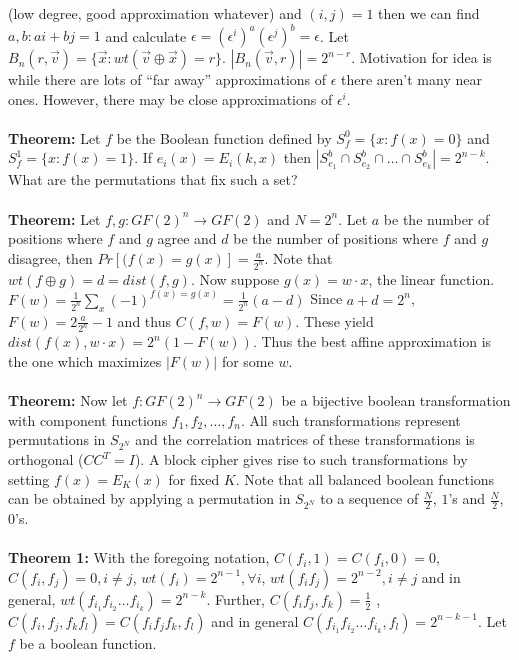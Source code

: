 (low degree, good approximation whatever)
and $(i,j)=1$ then we can find $a, b: ai+bj=1$ and calculate
$\epsilon= (\epsilon^i)^a (\epsilon^j)^b= \epsilon$.  Let $B_n(r,{\vec v})=
\{ {\vec x} :  wt({\vec v} \oplus {\vec x}) =r \}$. $|B_n({\vec v}, r)|= 2^{n-r}$.  
Motivation for idea is while
there are lots of ``far away'' approximations of $\epsilon$ there aren't many near ones.  
However,
there may be close approximations of $\epsilon^i$.
\\
\\
{\bf Theorem:}
Let $f$ be the Boolean function defined by
$S^0_f= \{x: f(x)=0 \}$ and
$S^1_f= \{x: f(x)=1 \}$.  
If $e_i(x)= E_i(k,x)$ then 
$| S^{b}_{e_1} \cap S^{b}_{e_2} \cap \ldots \cap S^{b}_{e_k} |=2^{n-k}$.  What
are the permutations that fix such a set?
\\
\\
{\bf Theorem:}
Let $f,g: GF(2)^n \rightarrow GF(2)$ and $N= 2^n$.
Let $a$ be the number of positions where $f$ and $g$ agree and
$d$ be the number of positions where $f$ and $g$ disagree, then
$Pr[(f(x)=g(x)] = {\frac a {2^n}}$.
Note that
$wt(f \oplus g)=d= dist(f,g)$.  
Now suppose $g(x)= w \cdot x$,
the linear function.  $F(w)= {\frac 1 {2^n}} \sum_x (-1)^{f(x)=g(x)}= {\frac 1 {2^n}} (a-d)$
Since $a+d=2^n$, $F(w)= 2 {\frac a {2^n}} -1$ and thus $C(f,w)= F(w)$.  These yield
$dist(f(x),w \cdot x)= 2^n(1-F(w))$.  Thus the best affine approximation is the one which
maximizes $|F(w)|$ for some $w$.
\\
\\
{\bf Theorem:}
Now let $f: GF(2)^n \rightarrow GF(2)$ be a bijective boolean transformation with component
functions $f_1 , f_2 , \ldots , f_n$.  All such transformations represent
permutations in $S_{2^N}$ and the correlation matrices of these transformations is orthogonal
($C C^T = I$).  A block cipher gives rise to such transformations by setting $f(x)= E_K(x)$ for
fixed $K$.  Note that all balanced boolean functions can be obtained by applying a
permutation in $S_{2^N}$ to a sequence of ${\frac N 2}$, $1$'s and ${\frac N 2}$, $0$'s.
\\
\\
{\bf Theorem 1:} 
With the foregoing notation,
$C(f_i,1)= C(f_i,0)=0$, $C(f_i, f_j)=0, i \ne j$,
$wt(f_i)= 2^{n-1}, \forall i$, $wt(f_i f_j) = 2^{n-2}, i \ne j$ and in general,
$wt( f_{i_1} f_{i_2} \ldots f_{i_k})= 2^{n-k}$.  Further, $C(f_i f_j, f_k)= {\frac 1 2}$ ,
$C(f_i, f_j, f_k f_l) = C(f_i f_j f_k, f_l)$ and
in general
$C( f_{i_1} f_{i_2} \ldots f_{i_k}, f_l)= 2^{n-k-1}$. Let $f$ be a boolean function.

